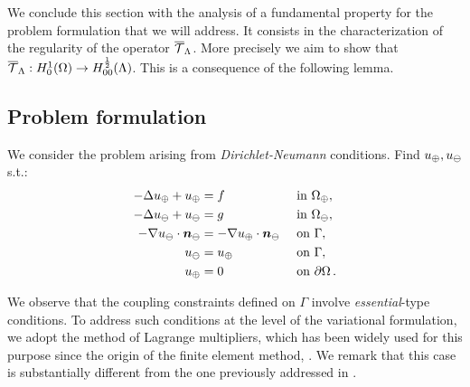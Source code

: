 \documentclass[r]{siamart171218}
\begin{document}
We conclude this section with the analysis of a fundamental property for the problem formulation that we will address.
It consists in the characterization of the regularity of the operator ${\overline{\mathcal{T}}_\Lambda}$.
More precisely we aim to show that ${\overline{\mathcal{T}}_\Lambda}: H^1_0(\Omega) \rightarrow H^\frac12_{00}(\Lambda)$.
This is a consequence of the following lemma.



\subsection{Problem formulation}
We consider the problem arising from \emph{Dirichlet-Neumann} conditions. Find $u_{\oplus},u_{\ominus}$ s.t.:
\begin{subequations}\label{eq:dirneu}
\begin{align}
\label{eq:dirneu1}
- \Delta \up  + \up &= f  && \text{ in } \Omega_{\oplus},\\
\label{eq:dirneu2}
- \Delta \uf  + \uf &= g  && \text{ in } \Omega_\ominus,\\
\label{eq:dirneu3}
-\nabla \uf \cdot \nn_{\ominus} &= -\nabla \up \cdot \nn_{\ominus}  && \text{ on } \Gamma,\\
\label{eq:dirneu4}
\uf &= \up && \text{ on }  \Gamma,\\
\label{eq:dirneu5}
\up &= 0 && \text{ on } \partial \Omega\,.
\end{align}
\end{subequations}

We observe that the coupling constraints defined on $\Gamma$ involve \emph{essential}-type conditions.
To address such conditions at the level of the variational formulation, we adopt the method of Lagrange multipliers,
which has been widely used for this purpose since the origin of the finite element method, \cite{MR359352}.
We remark that this case is substantially different from the one previously addressed in \cite{laurino_m2an}.
\end{document}
